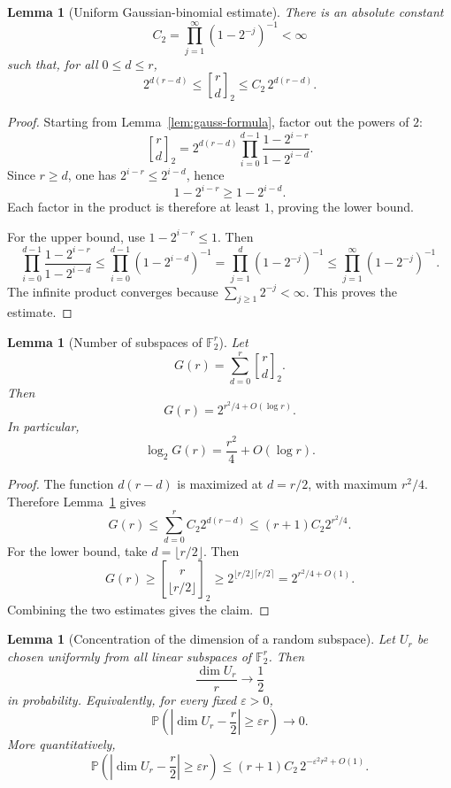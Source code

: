 \documentclass[a4paper,11pt]{amsart}
\newtheorem{lemma}[theorem]{Lemma}
\theoremstyle{remark}
\newcommand{\F}{\mathbb F}
\newcommand{\Prob}{\mathbb P}
\newcommand{\gbinom}[2]{\genfrac{[}{]}{0pt}{}{#1}{#2}_2}
\begin{document}
\begin{lemma}[Uniform Gaussian-binomial estimate]\label{lem:gauss-estimate}
There is an absolute constant
\[
        C_2=\prod_{j=1}^{\infty}(1-2^{-j})^{-1}<\infty
\]
such that, for all \(0\leq d\leq r\),
\[
        2^{d(r-d)}\leq \gbinom{r}{d}\leq C_2\,2^{d(r-d)}.
\]
\end{lemma}

\begin{proof}
Starting from Lemma~\ref{lem:gauss-formula}, factor out the powers of \(2\):
\[
        \gbinom{r}{d}
        =2^{d(r-d)}
        \prod_{i=0}^{d-1}\frac{1-2^{i-r}}{1-2^{i-d}}.
\]
Since \(r\geq d\), one has \(2^{i-r}\leq 2^{i-d}\), hence
\[
        1-2^{i-r}\geq 1-2^{i-d}.
\]
Each factor in the product is therefore at least \(1\), proving the lower bound.

For the upper bound, use \(1-2^{i-r}\leq 1\). Then
\[
        \prod_{i=0}^{d-1}\frac{1-2^{i-r}}{1-2^{i-d}}
        \leq
        \prod_{i=0}^{d-1}(1-2^{i-d})^{-1}
        =
        \prod_{j=1}^{d}(1-2^{-j})^{-1}
        \leq
        \prod_{j=1}^{\infty}(1-2^{-j})^{-1}.
\]
The infinite product converges because \(\sum_{j\geq 1}2^{-j}<\infty\). This proves the estimate.
\end{proof}

\begin{lemma}[Number of subspaces of \(\F_2^r\)]\label{lem:subspace-total}
Let
\[
        G(r)=\sum_{d=0}^{r}\gbinom{r}{d}.
\]
Then
\[
        G(r)=2^{r^2/4+O(\log r)}.
\]
In particular,
\[
        \log_2 G(r)=\frac{r^2}{4}+O(\log r).
\]
\end{lemma}

\begin{proof}
The function \(d(r-d)\) is maximized at \(d=r/2\), with maximum \(r^2/4\). Therefore
Lemma~\ref{lem:gauss-estimate} gives
\[
        G(r)
        \leq
        \sum_{d=0}^r C_2 2^{d(r-d)}
        \leq
        (r+1)C_2 2^{r^2/4}.
\]
For the lower bound, take \(d=\lfloor r/2\rfloor\). Then
\[
        G(r)\geq \gbinom{r}{\lfloor r/2\rfloor}
        \geq 2^{\lfloor r/2\rfloor\lceil r/2\rceil}
        =2^{r^2/4+O(1)}.
\]
Combining the two estimates gives the claim.
\end{proof}

\begin{lemma}[Concentration of the dimension of a random subspace]\label{lem:dimension-concentration}
Let \(U_r\) be chosen uniformly from all linear subspaces of \(\F_2^r\). Then
\[
        \frac{\dim U_r}{r}\to \frac12
\]
in probability. Equivalently, for every fixed \(\varepsilon>0\),
\[
        \Prob\left(\left|\dim U_r-\frac r2\right|\geq \varepsilon r\right)\to 0.
\]
More quantitatively,
\[
        \Prob\left(\left|\dim U_r-\frac r2\right|\geq \varepsilon r\right)
        \leq
        (r+1)C_2\,2^{-\varepsilon^2r^2+O(1)}.
\]
\end{lemma}
\end{document}

